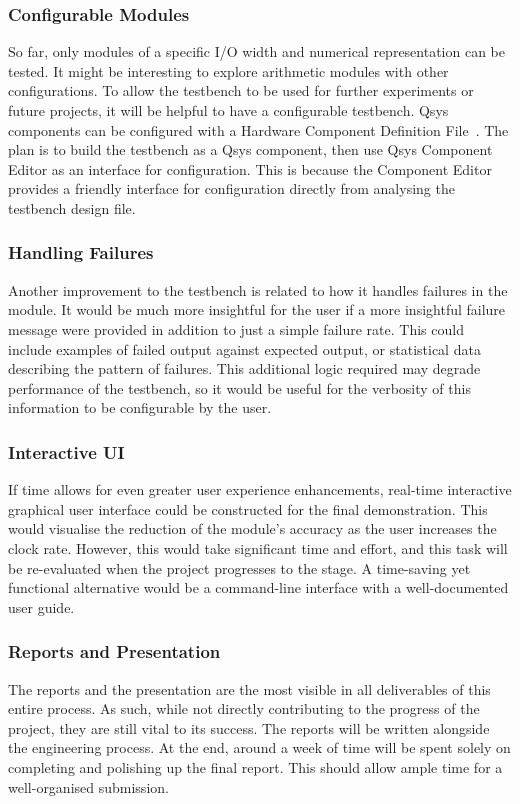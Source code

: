 \subsubsection{\textbf{Configurable Modules}}
So far, only modules of a specific I/O width and numerical representation can
be tested.
It might be interesting to explore arithmetic modules with other configurations.
To allow the testbench to be used for further experiments or future projects,
it will be helpful to have a configurable testbench.
Qsys components can be configured with a Hardware Component Definition
File~\cite{Altera5}.
The plan is to build the testbench as a Qsys component, then use Qsys Component
Editor as an interface for configuration.
This is because the Component Editor provides a friendly interface for
configuration directly from analysing the testbench design file.

\subsubsection{\textbf{Handling Failures}}
Another improvement to the testbench is related to how it handles failures
in the module.
It would be much more insightful for the user if a more insightful failure
message were provided in addition to just a simple failure rate.
This could include examples of failed output against expected output,
or statistical data describing the pattern of failures.
This additional logic required may degrade performance of the testbench,
so it would be useful for the verbosity of this information to be configurable
by the user.

\subsubsection{\textbf{Interactive UI}}
If time allows for even greater user experience enhancements, real-time
interactive graphical user interface could be constructed for the final
demonstration.
This would visualise the reduction of the module's accuracy as the user
increases the clock rate.
However, this would take significant time and effort, and this task will
be re-evaluated when the project progresses to the stage.
A time-saving yet functional alternative would be a command-line interface
with a well-documented user guide.

\subsubsection{\textbf{Reports and Presentation}}
The reports and the presentation are the most visible in all deliverables of
this entire process.
As such, while not directly contributing to the progress of the project,
they are still vital to its success.
The reports will be written alongside the engineering process.
At the end, around a week of time will be spent solely on completing and
polishing up the final report.
This should allow ample time for a well-organised submission.

